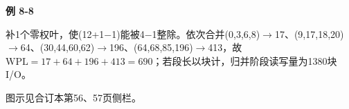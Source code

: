 {\color{ink}\bfseries 例 8-8}\par\vspace{1bp}补1个零权叶，使(12+\allowbreak{}1\(-\)1)能被4\(-\)1整除。依次合并(0,\allowbreak{}3,\allowbreak{}6,\allowbreak{}8)\(\to \)17、(9,\allowbreak{}17,\allowbreak{}18,\allowbreak{}20)\(\to \)64、(30,\allowbreak{}44,\allowbreak{}60,\allowbreak{}62)\(\to \)196、(64,\allowbreak{}68,\allowbreak{}85,\allowbreak{}196)\(\to \)413，故\(\mathrm{WPL}=\allowbreak{}17+\allowbreak{}64+\allowbreak{}196+\allowbreak{}413=\allowbreak{}690\)；若段长以块计，归并阶段读写量为1380块I/\allowbreak{}O。\par {\color{ink}图示见合订本第56、57页侧栏。}

